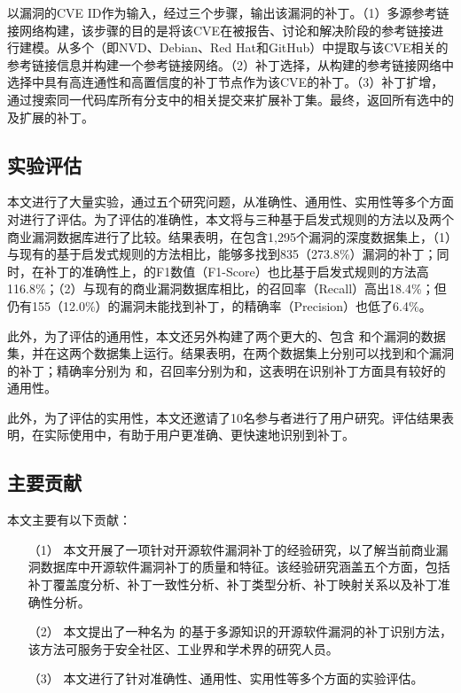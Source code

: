 \tool 以漏洞的CVE ID作为输入，经过三个步骤，输出该漏洞的补丁。（1）多源参考链接网络构建，该步骤的目的是将该CVE在被报告、讨论和解决阶段的参考链接进行建模。\tool 从多个（即NVD、Debian、Red Hat和GitHub）中提取与该CVE相关的参考链接信息并构建一个参考链接网络。（2）补丁选择，\tool 从构建的参考链接网络中选择中具有高连通性和高置信度的补丁节点作为该CVE的补丁。（3）补丁扩增，\tool 通过搜索同一代码库所有分支中的相关提交来扩展补丁集。最终，返回所有选中的及扩展的补丁。

\subsection{实验评估}
本文进行了大量实验，通过五个研究问题，从准确性、通用性、实用性等多个方面对\tool 进行了评估。为了评估\tool 的准确性，本文将\tool 与三种基于启发式规则的方法以及两个商业漏洞数据库进行了比较。结果表明，在包含1,295个漏洞的深度数据集上，（1）与现有的基于启发式规则的方法相比，\tool 能够多找到835（273.8\%）漏洞的补丁；同时，在补丁的准确性上，\tool 的F1数值（F1-Score）也比基于启发式规则的方法高116.8\%；（2）与现有的商业漏洞数据库相比，\tool 的召回率（Recall）高出18.4\%；但仍有155（12.0\%）的漏洞\tool 未能找到补丁，\tool 的精确率（Precision）也低了6.4\%。%

此外，为了评估\tool 的通用性，本文还另外构建了两个更大的、包含 和个漏洞的数据集，并在这两个数据集上运行\tool 。结果表明，\tool 在两个数据集上分别可以找到和个漏洞的补丁；精确率分别为 和，召回率分别为和，这表明\tool 在识别补丁方面具有较好的通用性。

此外，为了评估\tool 的实用性，本文还邀请了10名参与者进行了用户研究。评估结果表明，在实际使用中，\tool 有助于用户更准确、更快速地识别到补丁。

\subsection{主要贡献}
本文主要有以下贡献：
\begin{enumerate}
\item [（1）]本文开展了一项针对开源软件漏洞补丁的经验研究，以了解当前商业漏洞数据库中开源软件漏洞补丁的质量和特征。该经验研究涵盖五个方面，包括补丁覆盖度分析、补丁一致性分析、补丁类型分析、补丁映射关系以及补丁准确性分析。
\item [（2）]本文提出了一种名为 \tool 的基于多源知识的开源软件漏洞的补丁识别方法，该方法可服务于安全社区、工业界和学术界的研究人员。
\item [（3）]本文进行了针对\tool 准确性、通用性、实用性等多个方面的实验评估。
\end{enumerate}


